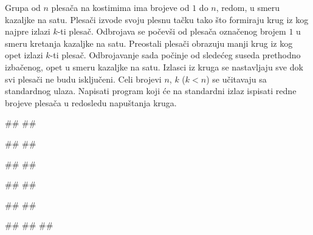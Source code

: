\begin{Exercise}[label=612]
Grupa od $n$ plesača na kostimima ima brojeve od $1$ do $n$, redom, u smeru kazaljke na satu.
Plesači izvode svoju plesnu tačku tako što formiraju krug iz kog najpre izlazi $k$-ti plesač.
Odbrojava se počevši od plesača označenog brojem $1$ u smeru kretanja kazaljke na satu. 
Preostali plesači obrazuju manji krug iz kog opet izlazi $k$-ti plesač. Odbrojavanje sada počinje od
sledećeg suseda prethodno izbačenog, opet u smeru kazaljke na satu. Izlasci iz kruga se nastavljaju
sve dok svi plesači ne budu isključeni. 
Celi brojevi $n$, $k$ ($k < n$) se učitavaju sa standardnog ulaza. 
Napisati program koji će na standardni izlaz ispisati redne brojeve plesača u redosledu napuštanja kruga. 


\begin{minitest}
\begin{test}{1}
#\naslovUlaz#
##

#\naslovIzlaz# 
##
\end{test}
\end{minitest}
\begin{minitest}
\begin{test}{2}
#\naslovUlaz#
##

#\naslovIzlaz# 
## 
\end{test}
\end{minitest}
\begin{minitest}
\begin{test}{3}
#\naslovUlaz#
##

#\naslovIzlaz# 
##
##
\end{test}
\end{minitest}
\end{Exercise}

